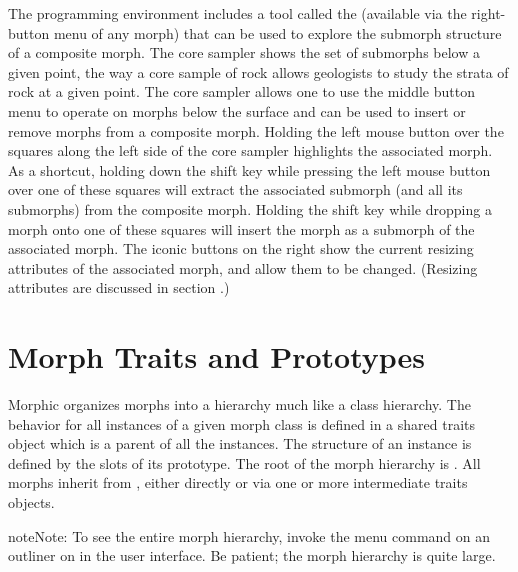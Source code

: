 \documentclass[letterpaper,10pt,english]{sphinxmanual}
\begin{document}
The programming environment includes a tool called the  (available via the right-button menu of any morph) that can be used to explore the submorph structure of a composite morph. The core sampler shows the set of submorphs below a given point, the way a core sample of rock allows geologists to study the strata of rock at a given point. The core sampler allows one to use the middle button menu to operate on morphs below the surface and can be used to insert or remove morphs from a composite morph. Holding the left mouse button over the squares along the left side of the core sampler highlights the associated morph. As a shortcut, holding down the shift key while pressing the left mouse button over one of these squares will extract the associated submorph (and all its submorphs) from the composite morph. Holding the shift key while dropping a morph onto one of these squares will insert the morph as a submorph of the associated morph. The iconic buttons on the right show the current resizing attributes of the associated morph, and allow them to be changed. (Resizing attributes are discussed in section {\hyperref[\detokenize{morphic:resize-attribute-summary}]{}}.)


\section{Morph Traits and Prototypes}
\label{\detokenize{morphic:morph-traits-and-prototypes}}
Morphic organizes morphs into a hierarchy much like a class hierarchy. The behavior for all \sphinxquotedblleft{}instances\sphinxquotedblright{} of a given morph \sphinxquotedblleft{}class\sphinxquotedblright{} is defined in a shared traits object which is a parent of all the instances. The structure of an instance is defined by the slots of its prototype. The root of the morph hierarchy is . All morphs inherit from , either directly or via one or more intermediate traits objects.

\begin{sphinxadmonition}{note}{Note:}
To see the entire morph hierarchy, invoke the  menu command on an outliner on  in the user interface. Be patient; the morph hierarchy is quite large.
\end{sphinxadmonition}
\end{document}
